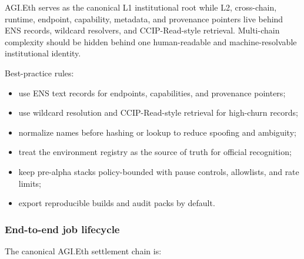 AGI.Eth serves as the canonical L1 institutional root while L2,
cross-chain, runtime, endpoint, capability, metadata, and provenance
pointers live behind ENS records, wildcard resolvers, and
CCIP-Read-style retrieval. Multi-chain complexity should be hidden
behind one human-readable and machine-resolvable institutional identity.

Best-practice rules:

\begin{itemize}
\tightlist
\item
  use ENS text records for endpoints, capabilities, and provenance
  pointers;
\item
  use wildcard resolution and CCIP-Read-style retrieval for high-churn
  records;
\item
  normalize names before hashing or lookup to reduce spoofing and
  ambiguity;
\item
  treat the environment registry as the source of truth for official
  recognition;
\item
  keep pre-alpha stacks policy-bounded with pause controls, allowlists,
  and rate limits;
\item
  export reproducible builds and audit packs by default.
\end{itemize}

\subsubsection{End-to-end job lifecycle}\label{end-to-end-job-lifecycle}

The canonical AGI.Eth settlement chain is:

\begin{Shaded}
\begin{Highlighting}[]
\end{Highlighting}
\end{Shaded}

